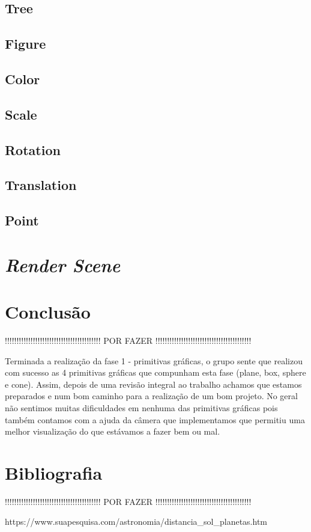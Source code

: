\documentclass[a4paper]{article}
\begin{document}
\subsection{Tree}
\label{sec:tree}

\subsection{Figure}
\label{sec:figure}

\subsection{Color}
\label{sec:color}

\subsection{Scale}
\label{sec:scale}

\subsection{Rotation}
\label{sec:rotation}

\subsection{Translation}
\label{sec:translation}

\subsection{Point}
\label{sec:point}


\newpage

\section{\textit{Render Scene}}


\newpage

\section{Conclusão}
\label{sec:conclusao}

!!!!!!!!!!!!!!!!!!!!!!!!!!!!!!!!!!!!!!!!! POR FAZER !!!!!!!!!!!!!!!!!!!!!!!!!!!!!!!!!!!!!!!!!

Terminada a realização da fase 1 - primitivas gráficas, o grupo sente que realizou com sucesso  as 4 primitivas gráficas que compunham esta fase (plane, box, sphere e cone).  Assim, depois de uma revisão integral ao trabalho achamos que estamos preparados e num bom caminho para a realização de um bom projeto.
No geral não sentimos muitas dificuldades em nenhuma das primitivas gráficas pois também contamos com a ajuda da câmera que implementamos que permitiu uma melhor visualização do que estávamos a fazer bem ou mal.


\section{Bibliografia}
\label{sec:bibliografia}

!!!!!!!!!!!!!!!!!!!!!!!!!!!!!!!!!!!!!!!!! POR FAZER !!!!!!!!!!!!!!!!!!!!!!!!!!!!!!!!!!!!!!!!!

https://www.suapesquisa.com/astronomia/distancia\_sol\_planetas.htm
\end{document}
